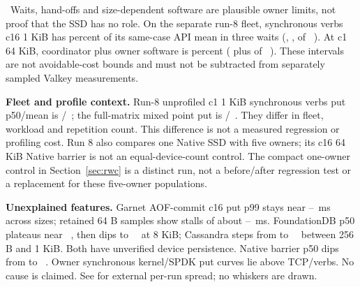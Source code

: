 \inference\ Waits, hand-offs and size-dependent software are plausible owner limits, not proof that the SSD has no role. On the separate run-8 fleet, synchronous verbs c16 1 KiB has  percent of its same-case API mean in three waits (, ,  of ~\us). At c1 64 KiB, coordinator plus owner software is  percent ( plus  of ~\us). These intervals are not avoidable-cost bounds and must not be subtracted from separately sampled Valkey measurements.

\textbf{Fleet and profile context.} Run-8 unprofiled c1 1 KiB synchronous verbs put p50/mean is /~\us; the full-matrix mixed point put is /~\us. They differ in fleet, workload and repetition count. This difference is not a measured regression or profiling cost. Run 8 also compares one Native SSD with five owners; its c16 64 KiB Native barrier is not an equal-device-count control.
The compact one-owner control in Section~\ref{sec:rwc} is a distinct run, not a before/after regression test or a replacement for these five-owner populations.

\textbf{Unexplained features.} Garnet AOF-commit c16 put p99 stays near --~ms across sizes; retained 64 B samples show stalls of about --~ms. FoundationDB p50 plateaus near ~\us, then dips to ~\us\ at 8 KiB; Cassandra steps from  to ~\us\ between 256 B and 1 KiB. Both have unverified device persistence. Native barrier p50 dips from  to ~\us. Owner synchronous kernel/SPDK put curves lie above TCP/verbs. No cause is claimed. See  for external per-run spread; no whiskers are drawn.

